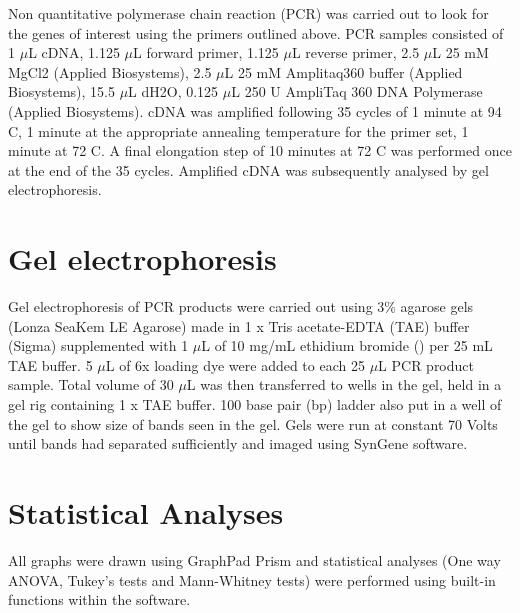 Non quantitative polymerase chain reaction (PCR) was carried out to look for the genes of interest using the primers outlined above.
PCR samples consisted of 1 $\mu$L cDNA, 1.125 $\mu$L forward primer, 1.125 $\mu$L reverse primer, 2.5 $\mu$L 25 mM MgCl{2} (Applied Biosystems), 2.5 $\mu$L 25 mM Amplitaq360 buffer (Applied Biosystems), 15.5 $\mu$L dH{2}O, 0.125 $\mu$L 250 U AmpliTaq 360 DNA Polymerase (Applied Biosystems).
cDNA was amplified following 35 cycles of 1 minute at 94 \textdegree C, 1 minute at the appropriate annealing temperature for the primer set, 1 minute at 72 \textdegree C. 
A final elongation step of 10 minutes at 72 \textdegree C was performed once at the end of the 35 cycles.
Amplified cDNA was subsequently analysed by gel electrophoresis.

\section{Gel electrophoresis}

Gel electrophoresis of PCR products were carried out using 3\% agarose gels (Lonza SeaKem LE Agarose) made in 1 x Tris acetate-EDTA (TAE) buffer (Sigma) supplemented with 1 $\mu$L of 10 mg/mL ethidium bromide () per 25 mL TAE buffer.
5 $\mu$L of 6x loading dye  were added to each 25 $\mu$L PCR product sample.
Total volume of 30 $\mu$L was then transferred to wells in the gel, held in a gel rig containing 1 x TAE buffer.
100 base pair (bp) ladder also put in a well of the gel to show size of bands seen in the gel.
Gels were run at constant 70 Volts until bands had separated sufficiently and imaged using SynGene software.

\section{Statistical Analyses}

All graphs were drawn using GraphPad Prism and statistical analyses (One way ANOVA, Tukey's tests and Mann-Whitney tests) were performed using built-in functions within the software.
